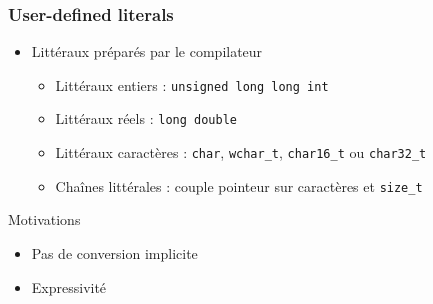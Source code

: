 \documentclass[C++.tex]{subfiles}
\begin{document}
\begin{frame}[fragile]
	\frametitle{User-defined literals}
	\begin{itemize}
		\item Littéraux \og préparés\fg{} par le compilateur
		\begin{itemize}
			\item Littéraux entiers : \lstinline|unsigned long long int|
			\item Littéraux réels : \lstinline|long double|
			\item Littéraux caractères : \lstinline|char|, \lstinline|wchar_t|, \lstinline|char16_t| ou \lstinline|char32_t|
			\item Chaînes littérales : couple pointeur sur caractères et \lstinline|size_t|
		\end{itemize}
	\end{itemize}

	\begin{block}{Motivations}
		\begin{itemize}
			\item Pas de conversion implicite
			\item Expressivité

		\end{itemize}
	\end{block}


\end{frame}
\end{document}
